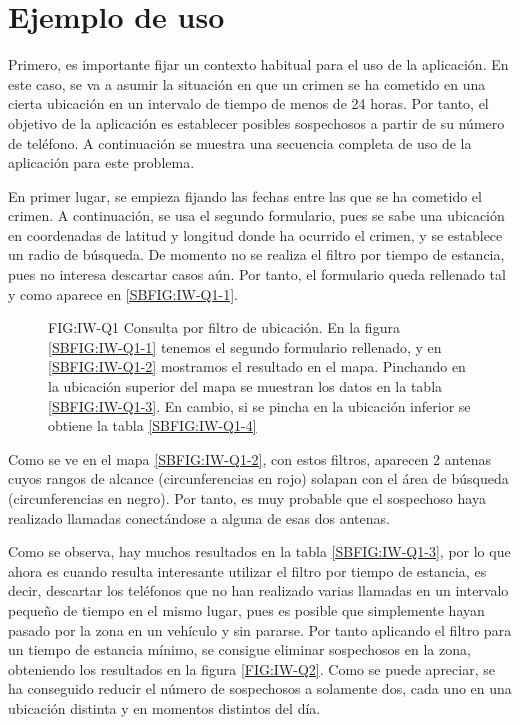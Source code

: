   \section{Ejemplo de uso}
    Primero, es importante fijar un contexto habitual para el uso de la aplicación. En este caso, se va a asumir la situación en que un crimen se ha cometido en una cierta ubicación en un intervalo de tiempo de menos de 24 horas. Por tanto, el objetivo de la aplicación es establecer posibles sospechosos a partir de su número de teléfono.
    A continuación se muestra una secuencia completa de uso de la aplicación para este problema.
    
    En primer lugar, se empieza fijando las fechas entre las que se ha cometido el crimen. A continuación, se usa el segundo formulario, pues se sabe una ubicación en coordenadas de latitud y longitud donde ha ocurrido el crimen, y se establece un radio de búsqueda. De momento no se realiza el filtro por tiempo de estancia, pues no interesa descartar casos aún. Por tanto, el formulario queda rellenado tal y como aparece en \ref{SBFIG:IW-Q1-1}.
    
    \begin{figure}[Consulta por filtro de ubicación]{FIG:IW-Q1}
      {Consulta por filtro de ubicación. En la figura \ref{SBFIG:IW-Q1-1} tenemos el segundo formulario rellenado, y en \ref{SBFIG:IW-Q1-2} mostramos el resultado en el mapa. Pinchando en la ubicación superior del mapa se muestran los datos en la tabla \ref{SBFIG:IW-Q1-3}. En cambio, si se pincha en la ubicación inferior se obtiene la tabla \ref{SBFIG:IW-Q1-4}}
      \quad
      \quad
      \quad
    \end{figure}
  
    Como se ve en el mapa \ref{SBFIG:IW-Q1-2}, con estos filtros, aparecen 2 antenas cuyos rangos de alcance (circunferencias en rojo) solapan con el área de búsqueda (circunferencias en negro). Por tanto, es muy probable que el sospechoso haya realizado llamadas conectándose a alguna de esas dos antenas.
    
    Como se observa, hay muchos resultados en la tabla \ref{SBFIG:IW-Q1-3}, por lo que ahora es cuando resulta interesante utilizar el filtro por tiempo de estancia, es decir, descartar los teléfonos que no han realizado varias llamadas en un intervalo pequeño de tiempo en el mismo lugar, pues es posible que simplemente hayan pasado por la zona en un vehículo y sin pararse. 
    Por tanto aplicando el filtro para un tiempo de estancia mínimo, se consigue eliminar sospechosos en la zona, obteniendo los resultados en la figura \ref{FIG:IW-Q2}. 
    Como se puede apreciar, se ha conseguido reducir el número de sospechosos a solamente dos, cada uno en una ubicación distinta y en momentos distintos del día.
    

